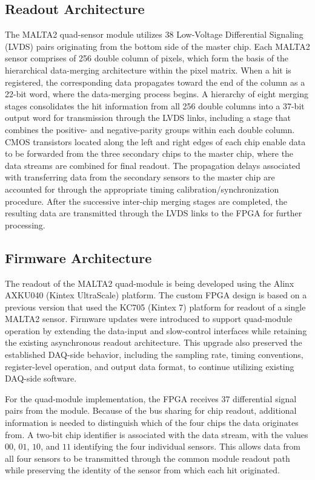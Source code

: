 \documentclass[pdftex,twocolumn,epjc3]{svjour3}          %
\begin{document}
\subsection{Readout Architecture}
The MALTA2 quad-sensor module utilizes 38 Low-Voltage Differential Signaling (LVDS) pairs originating from the bottom side of the master chip. Each MALTA2 sensor comprises of 256 double column of pixels, which form the basis of the hierarchical data-merging architecture within the pixel matrix. When a hit is registered, the corresponding data propagates toward the end of the column as a 22-bit word, where the data-merging process begins. A hierarchy of eight merging stages consolidates the hit information from all 256 double columns into a 37-bit output word for transmission through the LVDS links, including a stage that combines the positive- and negative-parity groups within each double column. CMOS transistors located along the left and right edges of each chip enable data to be forwarded from the three secondary chips to the master chip, where the data streams are combined for final readout. The propagation delays associated with transferring data from the secondary sensors to the master chip are accounted for through the appropriate timing calibration/synchronization procedure. After the successive inter-chip merging stages are completed, the resulting data are transmitted through the LVDS links to the FPGA for further processing.

\subsection{Firmware Architecture}
The readout of the MALTA2 quad-module is being developed using the Alinx AXKU040 (Kintex UltraScale) platform. The custom FPGA design is based on a previous version that used the KC705 (Kintex 7) platform for readout of a single MALTA2 sensor. Firmware updates were introduced to support quad-module operation by extending the data-input and slow-control interfaces while retaining the existing asynchronous readout architecture. This upgrade also preserved the established DAQ-side behavior, including the sampling rate, timing conventions, register-level operation, and output data format, to continue utilizing existing DAQ-side software.

For the quad-module implementation, the FPGA receives 37 differential signal pairs from the module. Because of the bus sharing for chip readout, additional information is needed to distinguish which of the four chips the data originates from. A two-bit chip identifier is associated with the data stream, with the values $00$, $01$, $10$, and $11$ identifying the four individual sensors. This allows data from all four sensors to be transmitted through the common module readout path while preserving the identity of the sensor from which each hit originated.
\end{document}
